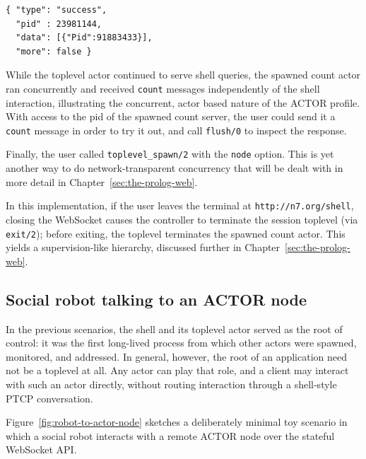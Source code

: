 \begin{verbatim}
{ "type": "success",
  "pid" : 23981144,
  "data": [{"Pid":91883433}],
  "more": false }
\end{verbatim}

\noindent While the toplevel actor continued to serve shell queries, the spawned count actor ran concurrently and received \texttt{count} messages independently of the shell interaction, illustrating the concurrent, actor based nature of the ACTOR profile. With access to the pid of the spawned count server, the user could send it a \texttt{count} message in order to try it out, and call \texttt{flush/0} to inspect the response.

Finally, the user called \texttt{toplevel\_spawn/2} with the \texttt{node} option. This is yet another way to do network-transparent concurrency that will be dealt with in more detail in Chapter~\ref{sec:the-prolog-web}.

In this implementation, if the user leaves the terminal at \texttt{http://n7.org/shell}, closing the WebSocket causes the controller to terminate the session toplevel (via \texttt{exit/2}); before exiting, the toplevel terminates the spawned count actor. This yields a supervision-like hierarchy, discussed further in Chapter~\ref{sec:the-prolog-web}.



\subsection{Social robot talking to an ACTOR node}\label{sec:robot-talking-to-actor-node}

In the previous scenarios, the shell and its toplevel actor served as the root of control: it was the first long-lived process from which other actors were spawned, monitored, and addressed. In general, however, the root of an application need not be a toplevel at all. Any actor can play that role, and a client may interact with such an actor directly, without routing interaction through a shell-style PTCP conversation.

Figure~\ref{fig:robot-to-actor-node} sketches a deliberately minimal toy scenario in which a social robot interacts with a remote ACTOR node over the stateful WebSocket API. 

